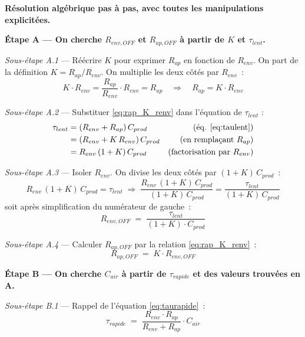 \documentclass[11pt,a4paper]{article}
\begin{document}
\begin{demo}
\textbf{Résolution algébrique pas à pas, avec toutes les manipulations explicitées.}

\medskip
\textbf{Étape A — On cherche $R_{env,OFF}$ et $R_{ap,OFF}$ à partir de $K$ et $\tau_{lent}$.}

\medskip
\emph{Sous-étape A.1} — Réécrire $K$ pour exprimer $R_{ap}$ en fonction de $R_{env}$.
On part de la définition $K = R_{ap}/R_{env}$. On multiplie les deux côtés par $R_{env}$~:
\begin{equation}
K \cdot R_{env} = \frac{R_{ap}}{R_{env}} \cdot R_{env} = R_{ap}
\quad\Longrightarrow\quad R_{ap} = K \cdot R_{env}
\label{eq:rap_K_renv}
\end{equation}

\emph{Sous-étape A.2} — Substituer \eqref{eq:rap_K_renv} dans l'équation de $\tau_{lent}$ :
\begin{align*}
\tau_{lent} &= (R_{env} + R_{ap})\,C_{prod} & \text{(éq. \ref{eq:taulent})} \\
&= (R_{env} + K\,R_{env})\,C_{prod} & \text{(en remplaçant }R_{ap}\text{)} \\
&= R_{env}\,(1 + K)\,C_{prod} & \text{(factorisation par }R_{env}\text{)}
\end{align*}

\emph{Sous-étape A.3} — Isoler $R_{env}$. On divise les deux côtés par $(1+K)\,C_{prod}$~:
\begin{equation}
R_{env}\,(1+K)\,C_{prod} = \tau_{lent}
\;\Longrightarrow\;
\frac{R_{env}\,(1+K)\,C_{prod}}{(1+K)\,C_{prod}} = \frac{\tau_{lent}}{(1+K)\,C_{prod}}
\end{equation}
soit après simplification du numérateur de gauche~:
\begin{equation}
\boxed{\;R_{env,OFF} \;=\; \frac{\tau_{lent}}{(1 + K) \cdot C_{prod}}\;}
\label{eq:Renv_off_formule}
\end{equation}

\emph{Sous-étape A.4} — Calculer $R_{ap,OFF}$ par la relation \eqref{eq:rap_K_renv}~:
\begin{equation}
\boxed{\;R_{ap,OFF} \;=\; K \cdot R_{env,OFF}\;}
\label{eq:Rap_off_formule}
\end{equation}

\medskip
\textbf{Étape B — On cherche $C_{air}$ à partir de $\tau_{rapide}$ et des valeurs trouvées
en A.}

\medskip
\emph{Sous-étape B.1} — Rappel de l'équation \eqref{eq:taurapide}~:
\begin{equation}
\tau_{rapide} \;=\; \frac{R_{env} \cdot R_{ap}}{R_{env} + R_{ap}} \cdot C_{air}
\end{equation}


\end{demo}
\end{document}
